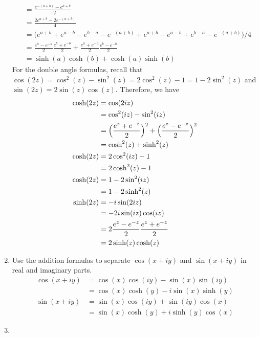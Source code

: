 \begin{enumerate}
\begin{align*}
                 & = \frac{e^{-(a + b)} - e^{a + b}}{-2}\\
                 & = \frac{2e^{a + b} - 2e^{-(a + b)}}{4}\\
                 & = \bigl(e^{a + b} + e^{a - b} - e^{b - a} - e ^{-(a + b)} +
                   e^{a + b} - e^{a - b} + e^{b - a} - e^{-(a + b)}\bigr)/4\\
                 & = \frac{e^a - e^{-a}}{2}\frac{e^b + e^{-b}}{2} +
                   \frac{e^a + e^{-a}}{2}\frac{e^b - e^{-b}}{2}\\
                 & = \sinh(a)\cosh(b) + \cosh(a)\sinh(b)
  \end{align*}
  For the double angle formulas, recall that
  \(\cos(2z) = \cos^2(z) - \sin^2(z) = 2\cos^2(z) - 1 = 1 - 2\sin^2(z)\) and
  \(\sin(2z) = 2\sin(z)\cos(z)\).
  Therefore, we have
  \begin{align*}
    \cosh(2z) & = \cos(2iz)\\
              & = \cos^2(iz) - \sin^2(iz)\\
              & = \Bigl(\frac{e^z + e^{-z}}{2}\Bigr)^2 +
                \Bigl(\frac{e^z - e^{-z}}{2}\Bigr)^2\\
              & = \cosh^2(z) + \sinh^2(z)\\
    \cosh(2z) & = 2\cos^2(iz) - 1\\
              & = 2\cosh^2(z) - 1\\
    \cosh(2z) & = 1 - 2\sin^2(iz)\\
              & = 1 - 2\sinh^2(z)\\
    \sinh(2z) & = -i\sin(2iz)\\
              & = -2i\sin(iz)\cos(iz)\\
              & = 2\frac{e^z - e^{-z}}{2}\frac{e^z + e^{-z}}{2}\\
              & = 2\sinh(z)\cosh(z)
  \end{align*}
\item
  Use the addition formulas to separate \(\cos(x + iy)\) and \(\sin(x + iy)\)
  in real and imaginary parts.
  \begin{align*}
    \cos(x + iy) & = \cos(x)\cos(iy) - \sin(x)\sin(iy)\\
                 & = \cos(x)\cosh(y) - i\sin(x)\sinh(y)\\
    \sin(x + iy) & = \sin(x)\cos(iy) + \sin(iy)\cos(x)\\
                 & = \sin(x)\cosh(y) + i\sinh(y)\cos(x)
  \end{align*}
\item

\end{enumerate}
